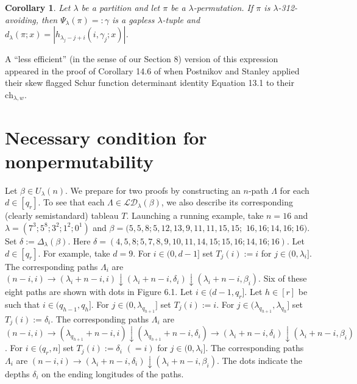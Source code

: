 \documentclass[11pt]{article}
\newtheorem{cor}[thm]{Corollary}
\theoremstyle{definition}
\theoremstyle{remark}
\numberwithin{equation}{section}
\begin{document}
\begin{spacing}{1.35}
\begin{cor}\label{cor777.3}Let $\lambda$ be a partition and let $\pi$ be a $\lambda$-permutation.  If $\pi$ is $\lambda$-312-avoiding, then $\Psi_\lambda(\pi) =: \gamma$ is a gapless $\lambda$-tuple and $d_\lambda(\pi;x) = | h_{\lambda_j-j+i}(i,\gamma_j;x) |$. \end{cor}

\noindent A ``less efficient'' (in the sense of our Section 8) version of this expression appeared in the proof of Corollary 14.6 of \cite{PS} when Postnikov and Stanley applied their skew flagged Schur function determinant identity Equation 13.1 to their $\text{ch}_{\lambda,w}$.











\section{Necessary condition for nonpermutability}

Let $\beta \in U_\lambda(n)$.  We prepare for two proofs by constructing an $n$-path $\Lambda$ for each $d \in [q_r]$.  To see that each $\Lambda \in \mathcal{LD}_\lambda(\beta)$, we also describe its corresponding (clearly semistandard) tableau $T$.  Launching a running example, take $n=16$ and $\lambda = (7^3; 5^8; 3^2; 1^2; 0^1)$ and $\beta = (5,5,8;5,12,13,9,11,11,15,15;$ $16,16;14,16;16)$.  Set $\delta := \Delta_\lambda(\beta)$.  Here $\delta = (4,5,8;5,7,8,9,10,11,14,15;15,16;14,16;16)$.  Let $d \in [q_r]$.  For example, take $ d = 9$.  For $i \in (0,d-1]$ set $T_j(i) := i$ for $j \in (0, \lambda_i]$.  The corresponding paths $\Lambda_i$ are $(n-i,i) \rightarrow (\lambda_i + n-i,i) \downarrow (\lambda_i+n-i, \delta_i) \downarrow (\lambda_i+n-i, \beta_i)$.  Six of these eight paths are shown with dots in Figure 6.1.  Let $i \in (d-1, q_r]$.  Let $h \in [r]$ be such that $i \in (q_{h-1}, q_h]$.  For $j \in (0, \lambda_{q_{h+1}}]$ set $T_j(i):=i$.  For $j \in (\lambda_{q_{h+1}}, \lambda_{q_h}]$ set $T_j(i) := \delta_i$.  The corresponding paths $\Lambda_i$ are $(n-i,i) \rightarrow (\lambda_{q_{h+1}}+n-i,i) \downarrow (\lambda_{q_{h+1}}+n-i, \delta_i) \rightarrow (\lambda_i + n - i, \delta_i) \downarrow (\lambda_i+n-i, \beta_i)$.  For $i \in (q_r, n]$ set $T_j(i) := \delta_i$ $(=i)$ for $j \in (0, \lambda_i]$.  The corresponding paths $\Lambda_i$ are $(n-i,i) \rightarrow (\lambda_i+n-i, \delta_i) \downarrow (\lambda_i+n-i, \beta_i)$.  The dots indicate the depths $\delta_i$ on the ending longitudes of the paths.









\end{spacing}
\end{document}
